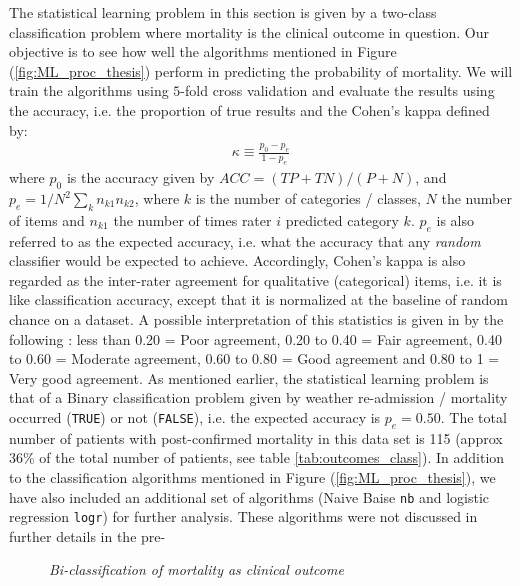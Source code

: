 \documentclass[../thesis.tex]{subfiles}
\begin{document}
\noindent The statistical learning problem in this section is given by a two-class classification problem where mortality is the clinical outcome in question. Our objective is to see how well the algorithms mentioned in Figure (\ref{fig:ML_proc_thesis}) perform in predicting the probability of mortality. We will train the algorithms using $5$-fold cross validation and evaluate the results using the accuracy, i.e. the proportion of true results and the Cohen's kappa defined by:
\begin{align}
    \kappa \equiv \frac{p_0 - p_e}{1 - p_e}
\end{align}
where $p_0$ is the accuracy given by ${\mathit  {ACC}}=({\mathit  {TP}}+{\mathit  {TN}})/(P+N)$, and $p_e = 1 / N^2 \sum_{k} n_{k1}n_{k2}$, where $k$ is the number of categories / classes, $N$ the number of items and $n_{k1}$ the number of times rater $i$ predicted category $k$. $p_e$ is also referred to as the expected accuracy, i.e. what the accuracy that any \textit{random} classifier would be expected to achieve. Accordingly, Cohen's kappa is also regarded as the inter-rater agreement for qualitative (categorical) items, i.e. it is like classification accuracy, except that it is normalized at the baseline of random chance on a dataset. A possible interpretation of this statistics is given in by the following \citep{ashby1991practical}: less than 0.20 = Poor agreement, 0.20 to 0.40 = Fair agreement, 0.40 to 0.60 = Moderate agreement, 0.60 to 0.80 = Good agreement and 0.80 to 1 = Very good agreement. As mentioned earlier, the statistical learning problem is that of a Binary classification problem given by weather re-admission / mortality occurred (\texttt{TRUE}) or not (\texttt{FALSE}), i.e. the expected accuracy is $p_e = 0.50$. The total number of patients with post-confirmed mortality in this data set is 115 (approx 36\% of the total number of patients, see table \ref{tab:outcomes_class}). In addition to the classification algorithms mentioned in Figure (\ref{fig:ML_proc_thesis}), we have also included an additional set of algorithms (Naive Baise \texttt{nb} and logistic regression \texttt{logr}) for further analysis. These algorithms were not discussed in further details in the pre- 
\begin{figure}[h!]
    \centering
    \scalebox{.8}{}
    \caption[Bi-classification of mortality as clinical outcome]{\textit{Bi-classification of mortality as clinical outcome}}
    \label{fig:bi_class_mort}
\end{figure}
\end{document}
